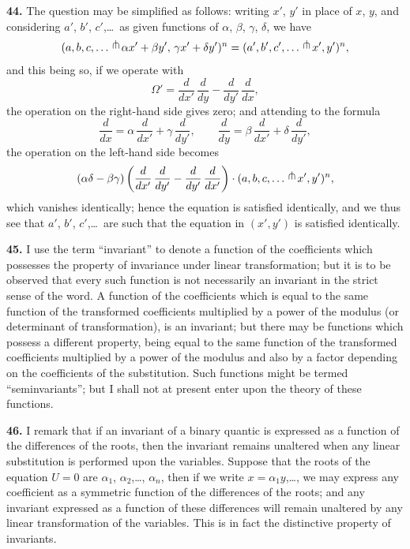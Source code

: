 \documentclass[11pt,a4paper]{article}
\begin{document}
\textbf{44.} The question may be simplified as follows: writing $x'$, $y'$ in place of $x$, $y$, and considering $a'$, $b'$, $c'$,\ldots\ as given functions of $\alpha$, $\beta$, $\gamma$, $\delta$, we have
\[
(a,b,c,\ldots\,\raisebox{0.5ex}{$\pitchfork$}\, \alpha x'+\beta y',\, \gamma x'+\delta y')^{n}
 = (a',b',c',\ldots\,\raisebox{0.5ex}{$\pitchfork$}\, x',y')^{n},
\]
and this being so, if we operate with
\[
\Omega'=\frac{d}{dx'}\,\frac{d}{dy}-\frac{d}{dy'}\,\frac{d}{dx},
\]
the operation on the right-hand side gives zero; and attending to the formula
\[
\frac{d}{dx}=\alpha\,\frac{d}{dx'}+\gamma\,\frac{d}{dy'},\qquad
\frac{d}{dy}=\beta\,\frac{d}{dx'}+\delta\,\frac{d}{dy'},
\]
the operation on the left-hand side becomes
\[
(\alpha\delta-\beta\gamma)
\left(\frac{d}{dx'}\,\frac{d}{dy'}-\frac{d}{dy'}\,\frac{d}{dx'}\right)
\cdot(a,b,c,\ldots\,\raisebox{0.5ex}{$\pitchfork$}\, x',y')^{n},
\]
which vanishes identically; hence the equation is satisfied identically, and we thus see that $a'$, $b'$, $c'$,\ldots\ are such that the equation in $(x',y')$ is satisfied identically.

\clearpage
\setcounter{page}{267}

\textbf{45.} I use the term ``invariant'' to denote a function of the coefficients which possesses the property of invariance under linear transformation; but it is to be observed that every such function is not necessarily an invariant in the strict sense of the word. A function of the coefficients which is equal to the same function of the transformed coefficients multiplied by a power of the modulus (or determinant of transformation), is an invariant; but there may be functions which possess a different property, being equal to the same function of the transformed coefficients multiplied by a power of the modulus and also by a factor depending on the coefficients of the substitution. Such functions might be termed ``seminvariants''; but I shall not at present enter upon the theory of these functions.

\textbf{46.} I remark that if an invariant of a binary quantic is expressed as a function of the differences of the roots, then the invariant remains unaltered when any linear substitution is performed upon the variables. Suppose that the roots of the equation $U=0$ are $\alpha_{1}$, $\alpha_{2}$,\ldots, $\alpha_{n}$, then if we write $x=\alpha_{1}y$,\ldots, we may express any coefficient as a symmetric function of the differences of the roots; and any invariant expressed as a function of these differences will remain unaltered by any linear transformation of the variables. This is in fact the distinctive property of invariants.
\end{document}
